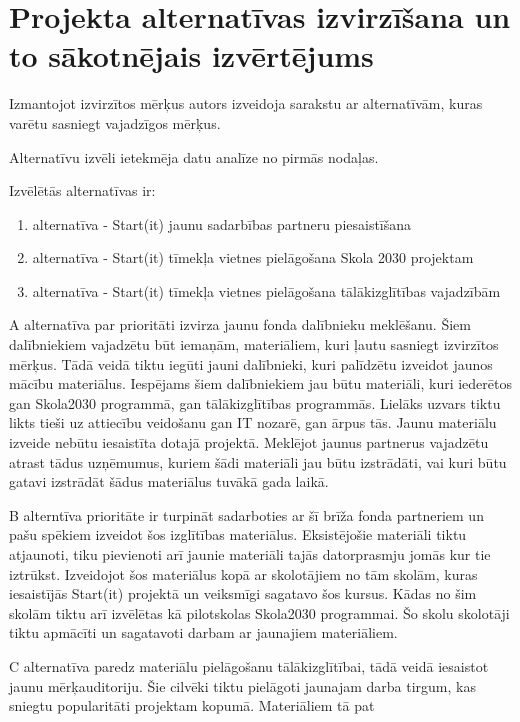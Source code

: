 \section{Projekta alternatīvas izvirzīšana un to sākotnējais izvērtējums}
Izmantojot izvirzītos mērķus autors izveidoja sarakstu ar alternatīvām, kuras varētu sasniegt vajadzīgos
mērķus.
\par
Alternatīvu izvēli ietekmēja datu analīze no pirmās nodaļas.
\par
Izvēlētās alternatīvas ir:
\renewcommand{\labelenumi}{\Alph{enumi}}
\begin{enumerate}
    \item alternatīva - Start(it) jaunu sadarbības partneru piesaistīšana
    \item alternatīva - Start(it) tīmekļa vietnes pielāgošana Skola 2030 projektam
    \item alternatīva - Start(it) tīmekļa vietnes pielāgošana tālākizglītības vajadzībām
\end{enumerate}
\renewcommand{\labelenumi}{\arabic{enumi}}
\par
A alternatīva par prioritāti izvirza jaunu fonda dalībnieku meklēšanu. Šiem dalībniekiem vajadzētu būt
iemaņām, materiāliem, kuri ļautu sasniegt izvirzītos mērķus. Tādā veidā tiktu iegūti jauni dalībnieki,
kuri palīdzētu izveidot jaunos mācību materiālus. Iespējams šiem dalībniekiem jau būtu materiāli, kuri
iederētos gan Skola2030 programmā, gan tālākizglītības programmās. Lielāks uzvars tiktu likts tieši uz 
attiecību veidošanu gan IT nozarē, gan ārpus tās. Jaunu materiālu izveide nebūtu iesaistīta dotajā projektā.
Meklējot jaunus partnerus vajadzētu atrast tādus uzņēmumus, kuriem šādi materiāli jau būtu izstrādāti, vai kuri būtu gatavi izstrādāt šādus materiālus tuvākā gada laikā.
\par
B alterntīva prioritāte ir turpināt sadarboties ar šī brīža fonda partneriem un pašu spēkiem izveidot šos
izglītības materiālus. Eksistējošie materiāli tiktu atjaunoti, tiku pievienoti arī jaunie materiāli tajās 
datorprasmju jomās kur tie iztrūkst. Izveidojot šos materiālus kopā ar skolotājiem no tām skolām, kuras
iesaistījās Start(it) projektā un veiksmīgi sagatavo šos kursus. Kādas no šim skolām tiktu arī izvēlētas kā 
pilotskolas Skola2030 programmai. Šo skolu skolotāji tiktu apmācīti un sagatavoti darbam ar jaunajiem materiāliem.
\par
C alternatīva paredz materiālu pielāgošanu tālākizglītībai, tādā veidā iesaistot jaunu mērķauditoriju. Šie
cilvēki tiktu pielāgoti jaunajam darba tirgum, kas sniegtu popularitāti projektam kopumā. Materiāliem tā pat
